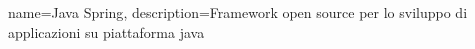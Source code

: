 {
	name={Java Spring},
	description={Framework open source per lo sviluppo di applicazioni su piattaforma java}
}